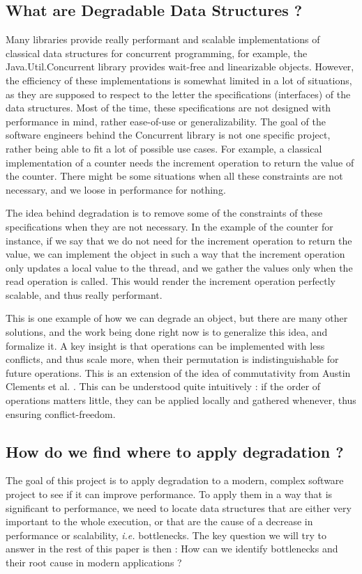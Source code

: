\documentclass[conference]{IEEEtran}
\begin{document}
\subsection{What are Degradable Data Structures ?}
Many libraries provide really performant and scalable implementations of classical data structures for concurrent programming, for example, the Java.Util.Concurrent library \cite{java_concurrent} provides wait-free and linearizable objects. However, the efficiency of these implementations is somewhat limited in a lot of situations, as they are supposed to respect to the letter the specifications (interfaces) of the data structures. Most of the time, these specifications are not designed with performance in mind, rather ease-of-use or generalizability. The goal of the software engineers behind the Concurrent library is not one specific project, rather being able to fit a lot of possible use cases. For example, a classical implementation of a counter needs the increment operation to return the value of the counter. There might be some situations when all these constraints are not necessary, and we loose in performance for nothing.

The idea behind degradation is to remove some of the constraints of these specifications when they are not necessary. In the example of the counter for instance, if we say that we do not need for the increment operation to return the value, we can implement the object in such a way that the increment operation only updates a local value to the thread, and we gather the values only when the read operation is called. This would render the increment operation perfectly scalable, and thus really performant.

This is one example of how we can degrade an object, but there are many other solutions, and the work being done right now is to generalize this idea, and formalize it. A key insight is that operations can be implemented with less conflicts, and thus scale more, when their permutation is indistinguishable for future operations. This is an extension of the idea of commutativity from Austin Clements et al. \cite{scalable}. This can be understood quite intuitively : if the order of operations matters little, they can be applied locally and gathered whenever, thus ensuring conflict-freedom.


\subsection{How do we find where to apply degradation ?}
The goal of this project is to apply degradation to a modern, complex software project to see if it can improve performance. To apply them in a way that is significant to performance, we need to locate data structures that are either very important to the whole execution, or that are the cause of a decrease in performance or scalability, \textit{i.e.} bottlenecks. The key question we will try to answer in the rest of this paper is then : How can we identify bottlenecks and their root cause in modern applications ?
\end{document}
